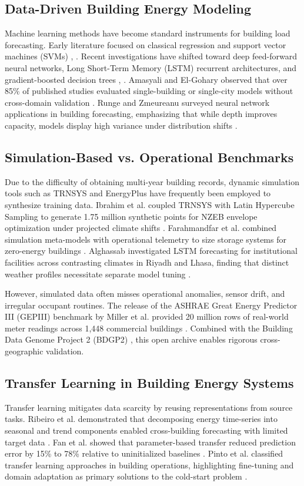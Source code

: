 \documentclass[conference]{IEEEtran}
\begin{document}
\subsection{Data-Driven Building Energy Modeling}
Machine learning methods have become standard instruments for building load forecasting. Early literature focused on classical regression and support vector machines (SVMs) \cite{b10}, \cite{b19}. Recent investigations have shifted toward deep feed-forward neural networks, Long Short-Term Memory (LSTM) recurrent architectures, and gradient-boosted decision trees \cite{b1}, \cite{b14}. Amasyali and El-Gohary observed that over 85\% of published studies evaluated single-building or single-city models without cross-domain validation \cite{b9}. Runge and Zmeureanu surveyed neural network applications in building forecasting, emphasizing that while depth improves capacity, models display high variance under distribution shifts \cite{b11}.

\subsection{Simulation-Based vs. Operational Benchmarks}
Due to the difficulty of obtaining multi-year building records, dynamic simulation tools such as TRNSYS and EnergyPlus have frequently been employed to synthesize training data. Ibrahim et al. coupled TRNSYS with Latin Hypercube Sampling to generate 1.75 million synthetic points for NZEB envelope optimization under projected climate shifts \cite{b7}. Farahmandfar et al. combined simulation meta-models with operational telemetry to size storage systems for zero-energy buildings \cite{b8}. Alghassab investigated LSTM forecasting for institutional facilities across contrasting climates in Riyadh and Lhasa, finding that distinct weather profiles necessitate separate model tuning \cite{b6}.

However, simulated data often misses operational anomalies, sensor drift, and irregular occupant routines. The release of the ASHRAE Great Energy Predictor III (GEPIII) benchmark by Miller et al. provided 20 million rows of real-world meter readings across 1,448 commercial buildings \cite{b1}. Combined with the Building Data Genome Project 2 (BDGP2) \cite{b2}, this open archive enables rigorous cross-geographic validation.

\subsection{Transfer Learning in Building Energy Systems}
Transfer learning mitigates data scarcity by reusing representations from source tasks. Ribeiro et al. demonstrated that decomposing energy time-series into seasonal and trend components enabled cross-building forecasting with limited target data \cite{b3}. Fan et al. showed that parameter-based transfer reduced prediction error by 15\% to 78\% relative to uninitialized baselines \cite{b4}. Pinto et al. classified transfer learning approaches in building operations, highlighting fine-tuning and domain adaptation as primary solutions to the cold-start problem \cite{b5}.
\end{document}
